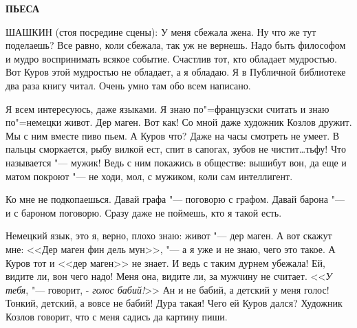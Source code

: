 \begin{center}
    \textbf{ПЬЕСА}
\end{center}

ШАШКИН  (стоя посредине сцены):  У  меня сбежала жена. Ну что же  тут поделаешь?  Все
равно, коли сбежала, так уж не вернешь. Надо быть философом и мудро  воспринимать  всякое
событие. Счастлив тот,  кто обладает  мудростью. Вот Куров этой мудростью  не обладает,
а  я  обладаю.  Я в Публичной библиотеке два раза  книгу читал. Очень  умно там обо  всем
написано.

Я всем интересуюсь, даже языками. Я знаю по"=французски считать и знаю по"=немецки  живот. Дер маген. Вот как! Со мной даже художник  Козлов  дружит.  Мы  с  ним вместе пиво пьем. А Куров что? Даже на часы  смотреть не умеет. В пальцы сморкается, рыбу вилкой ест, спит в сапогах, зубов не чистит\dots тьфу! Что называется "--- мужик!  Ведь с ним  покажись  в обществе: вышибут вон, да еще и матом покроют  "---  не ходи, мол, с мужиком, коли сам интеллигент.
    
Ко  мне не подкопаешься.  Давай графа "--- поговорю с графом. Давай барона  "--- и с бароном поговорю. Сразу даже не поймешь,  кто  я такой есть.
    
Немецкий язык, это я, верно, плохо знаю: живот "--- дер маген.  А вот  скажут мне:  <<Дер маген фин дель мун>>,  "---  а  я уже и не знаю, чего это такое. А Куров тот и <<дер маген>> не знает.  И ведь с таким дурнем  убежала!  Ей, видите ли, вон чего надо!  Меня она,  видите ли, за мужчину не считает. <<\textit{У тебя}, "---  говорит, - \textit{голос бабий!}>> Ан и не бабий,  а  детский у меня голос!  Тонкий, детский, а вовсе не бабий!  Дура такая!  Чего ей Куров дался? Художник  Козлов говорит,  что с меня садись да картину пиши.

